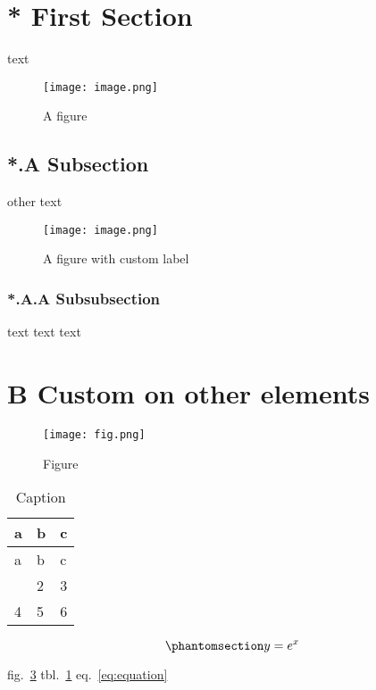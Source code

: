 \section{* First Section}\label{first-section}

text

\begin{figure}
\centering
\texttt{[image: image.png]}
\caption{A figure}\label{fig:fig1}
\end{figure}

\subsection{*.A Subsection}\label{subsection}

other text

\begin{figure}
\centering
\texttt{[image: image.png]}
\caption{A figure with custom label}\label{fig:fig2}
\end{figure}

\subsubsection{*.A.A Subsubsection}\label{subsubsection}

text text text

\section{B Custom on other elements}\label{custom-on-other-elements}

\begin{figure}
\centering
\texttt{[image: fig.png]}
\caption{Figure}\label{fig:fig3}
\end{figure}

\begin{longtable}[]{@{}lll@{}}
\caption{\label{tbl:table}Caption}\tabularnewline
\toprule\noalign{}
a & b & c \\
\midrule\noalign{}
\endfirsthead
\toprule\noalign{}
a & b & c \\
\midrule\noalign{}
\endhead
\bottomrule\noalign{}
\endlastfoot
1 & 2 & 3 \\
4 & 5 & 6 \\
\end{longtable}

\begin{equation}\phantomsection\label{eq:equation}{y = e^x}\end{equation}

fig.~\ref{fig:fig3} tbl.~\ref{tbl:table} eq.~\ref{eq:equation}
